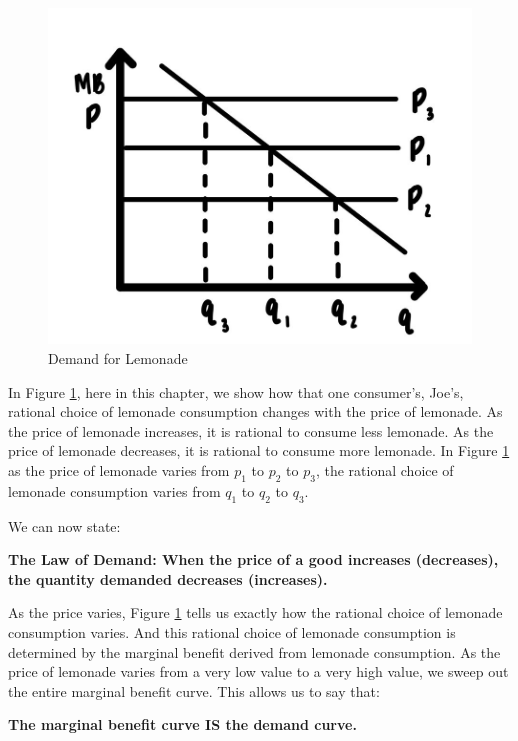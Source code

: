 \documentclass[
]{book}
\begin{document}
\begin{figure}

{\centering \includegraphics[width=0.75\linewidth]{img/demand/fig2} 

}

\caption{Demand for Lemonade}\label{fig:demand02}
\end{figure}

In Figure \ref{fig:demand02}, here in this chapter, we show how that one consumer's, Joe's, rational choice of lemonade consumption changes with the price of lemonade. As the price of lemonade increases, it is rational to consume less lemonade. As the price of lemonade decreases, it is rational to consume more lemonade. In Figure \ref{fig:demand02} as the price of lemonade varies from \(p_1\) to \(p_2\) to \(p_3\), the rational choice of lemonade consumption varies from \(q_1\) to \(q_2\) to \(q_3\).

We can now state:

\begin{iucolor}
\textbf{The Law of Demand: When the price of a good increases (decreases), the quantity demanded decreases (increases).}

\end{iucolor}

As the price varies, Figure \ref{fig:demand02} tells us exactly how the rational choice of lemonade consumption varies. And this rational choice of lemonade consumption is determined by the marginal benefit derived from lemonade consumption. As the price of lemonade varies from a very low value to a very high value, we sweep out the entire marginal benefit curve. This allows us to say that:

\begin{iucolor}
\textbf{The marginal benefit curve IS the demand curve.}

\end{iucolor}
\end{document}
